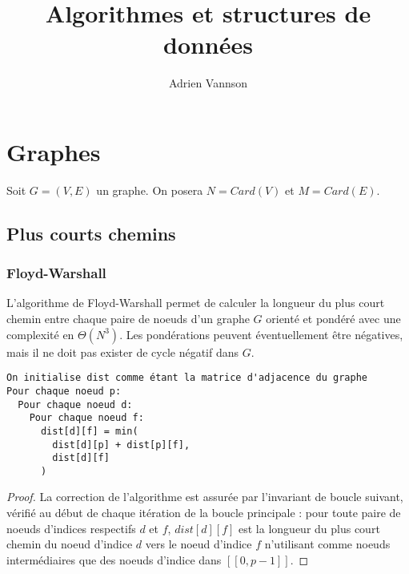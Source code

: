 \documentclass[11pt,a4paper]{article}
\title{Algorithmes et structures de données}
\author{Adrien Vannson}
\date{}
\begin{document}
\maketitle
\tableofcontents
\newpage

\section{Graphes}
Soit \(G=(V,E)\) un graphe. On posera \(N = Card(V)\) et \(M=Card(E)\).

  \subsection{Plus courts chemins}

    \subsubsection{Floyd-Warshall}

L'algorithme de Floyd-Warshall permet de calculer la longueur du plus court chemin entre chaque paire de noeuds d'un graphe \(G\) orienté et pondéré avec une complexité en \(\Theta(N^3)\). Les pondérations peuvent éventuellement être négatives, mais il ne doit pas exister de cycle négatif dans \(G\).

\begin{lstlisting}
On initialise dist comme étant la matrice d'adjacence du graphe
Pour chaque noeud p:
  Pour chaque noeud d:
    Pour chaque noeud f:
      dist[d][f] = min(
        dist[d][p] + dist[p][f],
        dist[d][f]
      )
\end{lstlisting}

\begin{proof}
La correction de l'algorithme est assurée par l'invariant de boucle suivant, vérifié au début de chaque itération de la boucle principale : pour toute paire de noeuds d'indices respectifs \(d\) et \(f\), \(dist[d][f]\) est la longueur du plus court chemin du noeud d'indice \(d\) vers le noeud d'indice \(f\) n'utilisant comme noeuds intermédiaires que des noeuds d'indice dans \( [\![0, p-1]\!] \).
\end{proof}
\end{document}

